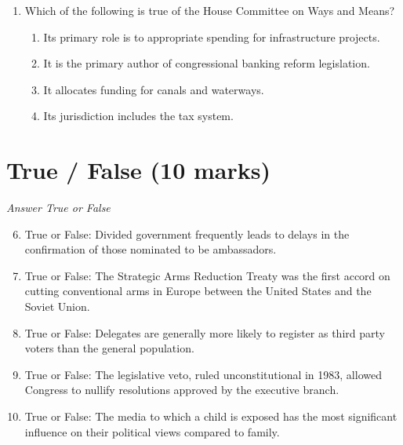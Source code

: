 \documentclass[12pt]{article}
\begin{document}
\begin{enumerate}[label=\arabic*.]
\begin{enumerate}[label=(\alph*)]
    \item Framers' unqualified commitment to individual rights
    \item small states' determination to receive equal representation in the legislature
    \item Northern states' support for abolitionism
    \item states' fears of an overpowerful national government
\end{enumerate}
\item Which of the following is true of the House Committee on Ways and Means?
\begin{enumerate}[label=(\alph*)]
    \item Its primary role is to appropriate spending for infrastructure projects.
    \item It is the primary author of congressional banking reform legislation.
    \item It allocates funding for canals and waterways.
    \item Its jurisdiction includes the tax system.
\end{enumerate}
\end{enumerate}

\section*{True / False (10 marks)}
\textit{Answer True or False}
\begin{enumerate}[label=\arabic*.]
\setcounter{enumi}{5}
\item True or False: Divided government frequently leads to delays in the confirmation of those nominated to be ambassadors.
\item True or False: The Strategic Arms Reduction Treaty was the first accord on cutting conventional arms in Europe between the United States and the Soviet Union.
\item True or False: Delegates are generally more likely to register as third party voters than the general population.
\item True or False: The legislative veto, ruled unconstitutional in 1983, allowed Congress to nullify resolutions approved by the executive branch.
\item True or False: The media to which a child is exposed has the most significant influence on their political views compared to family.
\end{enumerate}
\end{document}
